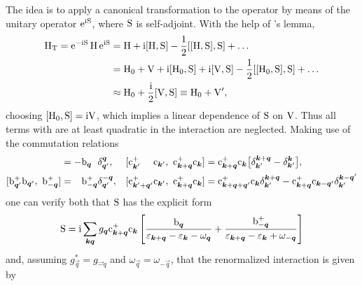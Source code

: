 The idea is to apply a canonical transformation to the  operator
by means of the unitary operator $\mathrm e^{\mathrm i \mathrm S}$, where $\mathrm S$ is self-adjoint.
With the help of 's lemma,
%
\begin{align*}
    \mathrm H \sb{\text{T}}
    = \mathrm e^{-\mathrm i \mathrm S} \, \mathrm H \, \mathrm e^{\mathrm i \mathrm S}
    &= \mathrm H + \mathrm i [\mathrm H, \mathrm S] - \frac 1 2 [[\mathrm H, \mathrm S], \mathrm S] + \dots \\
    &= \mathrm H_0 + \mathrm V + \mathrm i [\mathrm H_0, \mathrm S] + \mathrm i [\mathrm V, \mathrm S]
    - \frac 1 2 [[\mathrm H_0, \mathrm S], \mathrm S] + \dots \\
    &\approx \mathrm H_0 + \frac {\mathrm i} 2 [\mathrm V, \mathrm S] \equiv \mathrm H_0 + \mathrm V',
\end{align*}
%
choosing $[\mathrm H_0, \mathrm S] = \mathrm i \mathrm V$, which implies a linear dependence of
$\mathrm S$ on $\mathrm V$. Thus all terms with are at least quadratic in the
interaction are neglected. Making use of the commutation relations
%
\begin{align*}
    [\op b_{\vec q'}^+ \op b_{\vec q'}, \ \op b_{\vec q \phantom +}]
    &= -\op b_{\vec q \phantom +} \delta_{\vec q'}^{\vec q},
    &
    [ \op c_{\vec k' \phantom{+ \vec q'}}^+ \op c_{\vec k'},
    \ \op c_{\vec k + \vec q}^+ \op c_{\vec k} ]
    &= \op c_{\vec k + \vec q}^+ \op c_{\vec k}
    \big[ \delta_{\vec k'}^{\vec k + \vec q} - \delta_{\vec k'}^{\vec k} \big],
    \\
    [\op b_{\vec q'}^+ \op b_{\vec q'}, \ \op b_{-\vec q}^+]
    &= \phantom + \op b_{-\vec q}^+ \delta_{\vec q'}^{-\vec q},
    &
    [ \op c_{\vec k' + \vec q'}^+ \op c_{\vec k'},
    \  \op c_{\vec k  + \vec q }^+ \op c_{\vec k } ]
    &= \op c_{\vec k + \vec q + \vec q'}^+ \op c_{\vec k}
    \delta_{\vec k'}^{\vec k + \vec q}
    - \op c_{\vec k + \vec q}^+ \op c_{\vec k - \vec q'}
    \delta_{\vec k'}^{\vec k - \vec q'}
\end{align*}
%
one can verify both that $\mathrm S$ has the explicit form
%
\begin{equation*}
    \mathrm S = \mathrm i \sum_{\boldsymbol k \boldsymbol q} g_{\boldsymbol q}
    \mathrm c_{\boldsymbol k + \boldsymbol q}^+ \mathrm c_{\boldsymbol k} \left[
        \frac {\mathrm b_{\boldsymbol q}}
        {\varepsilon_{\boldsymbol k + \boldsymbol q} - \varepsilon_{\boldsymbol k} - \omega_{\boldsymbol q}}
        + \frac {\mathrm b_{-\boldsymbol q}^+}
        {\varepsilon_{\boldsymbol k + \boldsymbol q} - \varepsilon_{\boldsymbol k} + \omega_{-\boldsymbol q}}
    \right]
\end{equation*}
%
and, assuming $g_{\vec q}^* = g_{\vec - q}$ and $\omega_{\vec q} = \omega_{-\vec
q}$, that the renormalized interaction is given by
%

